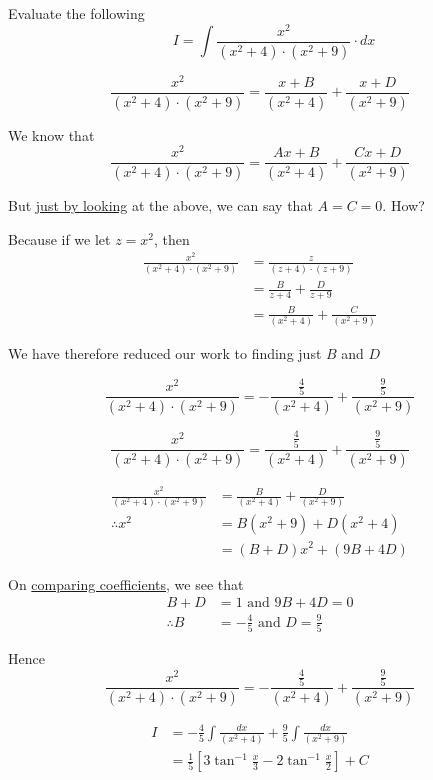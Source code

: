 \documentclass[14pt,fleqn]{extarticle}
\begin{document}
\newcommand\ea{ \left(x^2+4 \right)}
\newcommand\eb{ \left(x^2 + 9 \right)}
\newcommand\fa{ \frac{4}{5} }
\newcommand\fb{ \frac{9}{5} }
\newcommand\ec{ \frac{x^2}{\ea\cdot\eb} }

Evaluate the following \[\qquad I = \int \frac{x^2}{\ea\cdot\eb}\cdot dx\]
%

\newcard 

\[ \frac{x^2}{\ea\cdot\eb} = \frac{x+B}{\ea} + \frac{x+D}{\eb}\]

\newcard 

We know that 
\[ \frac{x^2}{\ea\cdot\eb} = \frac{Ax + B}{\ea} + \frac{Cx + D}{\eb}\]

But \underline{just by looking} at the above, we can say that $A=C=0$. How? \newline 

Because if we let $z = x^2$, then 
\begin{align}
	\frac{x^2}{\ea\cdot\eb} &= \frac{z}{\left(z+4 \right)\cdot \left(z+9 \right)}\\
	&= \frac{B}{z+4} + \frac{D}{z+9} \\
	&= \frac{B}{\ea} + \frac{C}{\eb}
\end{align}

We have therefore reduced our work to finding just $B$ and $D$ \newline 

\newcard

\[ \ec = -\frac{\fa}{\ea} + \frac{\fb}{\eb}\]

\newcard 

\[ \ec = \frac{\fa}{\ea} + \frac{\fb}{\eb} \]

\newcard 

\begin{align}
	\ec &= \frac{B}{\ea} + \frac{D}{\eb} \\
	\therefore x^2 &= B\eb + D\ea \\
	&= (B+D)x^2 + (9B+4D)
\end{align}

On \underline{comparing coefficients}, we see that 
\begin{align}
	B + D &= 1 \text{ and } 9B + 4D = 0 \\
	\therefore B &= -\fa\text{ and } D = \fb 
\end{align}

Hence 
\[ \ec = -\frac{\fa}{\ea} + \frac{\fb}{\eb}\]

\newcard 

\begin{align}
	I &= -\fa\int \frac{dx}{\ea} + \fb\int \frac{dx}{\eb} \\
	&= \frac{1}{5} \left[3\tan^{-1}\frac{x}{3} - 2\tan^{-1}\frac{x}{2} \right] + C
\end{align}
\end{document}
